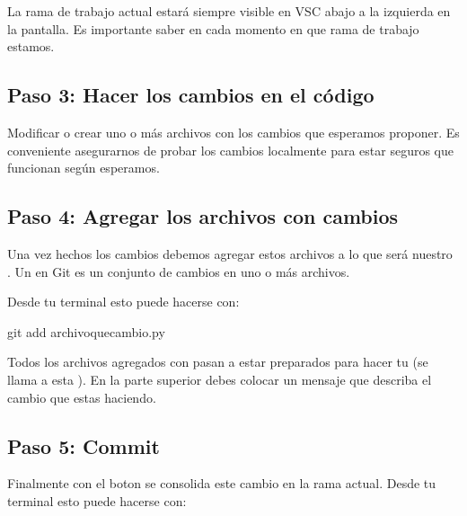\documentclass[a4paper,12pt,spanish]{sphinxmanual}
\begin{document}
\sphinxAtStartPar
La rama de trabajo actual estará siempre visible en VSC
abajo a la izquierda en la pantalla.
Es importante saber en cada momento en que rama de trabajo estamos.


\subsection{Paso 3: Hacer los cambios en el código}
\label{\detokenize{mi-primer-pr:paso-3-hacer-los-cambios-en-el-codigo}}
\sphinxAtStartPar
Modificar o crear uno o más archivos con los cambios que esperamos proponer.
Es conveniente asegurarnos de probar los cambios localmente para estar
seguros que funcionan según esperamos.


\subsection{Paso 4: Agregar los archivos con cambios}
\label{\detokenize{mi-primer-pr:paso-4-agregar-los-archivos-con-cambios}}
\sphinxAtStartPar
Una vez hechos los cambios debemos agregar estos archivos a lo que será nuestro .
Un  en Git es un conjunto de cambios en uno o más archivos.

\sphinxAtStartPar
Desde tu terminal esto puede hacerse con:

\begin{sphinxVerbatim}[commandchars=\\\{\}]
git add archivo\PYGZus{}que\PYGZus{}cambio.py
\end{sphinxVerbatim}

\noindent{}

\sphinxAtStartPar
Todos los archivos agregados con  pasan a estar preparados para hacer
tu  (se llama  a esta ).
En la parte superior debes colocar un mensaje que describa el cambio que estas haciendo.

\noindent{}


\subsection{Paso 5: Commit}
\label{\detokenize{mi-primer-pr:paso-5-commit}}
\sphinxAtStartPar
Finalmente con el boton  se consolida este cambio en la rama actual.
Desde tu terminal esto puede hacerse con:
\end{document}
